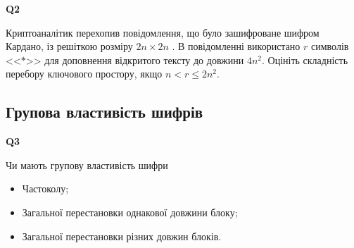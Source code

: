 \documentclass{../../test-template}
\begin{document}
\begin{tcolorbox}[lowerbox=invisible,colback=white]
    \begin{minipage}{0.1\textwidth}
        \raggedright
        \vspace*{\fill}
            \textbf{Q2}
        \vspace*{\fill}
        \end{minipage}
        \begin{minipage}{0.75\textwidth}
        Криптоаналітик перехопив повідомлення, що було зашифроване шифром Кардано, із решіткою розміру $2n\times2n$ . В повідомленні використано $r$ символів <<$*$>> для доповнення відкритого тексту до довжини $4n^2$. Оцініть складність перебору ключового простору, якщо $n<r\leq 2n^2$. 
        \end{minipage}
\end{tcolorbox}

\subsection{Групова властивість шифрів}
\begin{tcolorbox}[lowerbox=invisible,colback=white]
    \begin{minipage}{0.1\textwidth}
        \raggedright
        \vspace*{\fill}
            \textbf{Q3}
        \vspace*{\fill}
        \end{minipage}
        \begin{minipage}{0.75\textwidth}
        Чи мають групову властивість шифри
        \begin{itemize}
            \item Частоколу;
            \item Загальної перестановки однакової довжини блоку;
            \item Загальної перестановки різних довжин блоків.
        \end{itemize}
        \end{minipage}
\end{tcolorbox}
\end{document}
